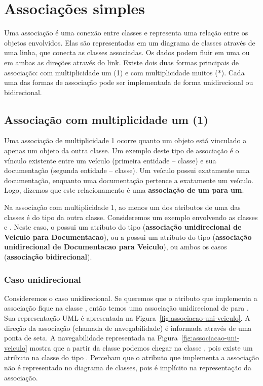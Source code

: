 \chapter{Associações simples}

Uma associação é uma conexão entre classes e representa uma relação entre os objetos envolvidos. Elas são representadas em um diagrama de classes através de uma linha, que conecta as classes associadas. Os dados podem fluir em uma ou em ambas as direções através do link. Existe dois duas formas principais de associação: com multiplicidade um (1) e com multiplicidade muitos (*). Cada uma das formas de associação pode ser implementada de forma unidirecional ou bidirecional.


\section{Associação com multiplicidade um (1)}

Uma associação de multiplicidade 1 ocorre quanto um objeto está vinculado a apenas um objeto da outra classe. Um exemplo deste tipo de associação é o vínculo existente entre um veículo (primeira entidade -- classe) e sua documentação (segunda entidade -- classe). Um veículo possui exatamente uma documentação, enquanto uma documentação pertence a exatamente um veículo. Logo, dizemos que este relacionamento é uma \textbf{associação de um para um}.

Na associação com multiplicidade 1, ao menos um dos atributos de uma das classes é do tipo da outra classe. Consideremos um exemplo envolvendo as classes  e . Neste caso, o  possui um atributo do tipo  (\textbf{associação unidirecional de Veiculo para Documentacao}), ou a  possui um atributo do tipo  (\textbf{associação unidirecional de Documentacao para Veiculo}), ou ambos os casos (\textbf{associação bidirecional}).

\subsection{Caso unidirecional}

Consideremos o caso unidirecional. Se queremos que o atributo que implementa a associação fique na classe , então temos uma associação unidirecional de  para . Sua representação UML é apresentada na Figura~\ref{fig:associacao-uni-veiculo}. A direção da associação (chamada de navegabilidade) é informada através de uma ponta de seta. A navegabilidade representada na Figura~\ref{fig:associacao-uni-veiculo} mostra que a partir da classe  podemos chegar na classe , pois existe um atributo na classe  do tipo . Percebam que o atributo que implementa a associação não é representado no diagrama de classes, pois é implícito na representação da associação.

